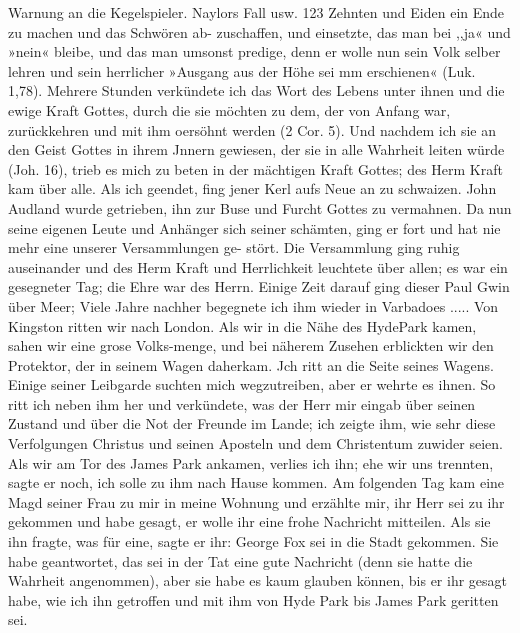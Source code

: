 Warnung an die Kegelspieler. Naylors Fall usw. 123
Zehnten und Eiden ein Ende zu machen und das Schwören ab-
zuschaffen, und einsetzte, das man bei ,,ja« und »nein« bleibe,
und das man umsonst predige, denn er wolle nun sein Volk
selber lehren und sein herrlicher »Ausgang aus der Höhe sei mm
erschienen« (Luk. 1,78). Mehrere Stunden verkündete ich das
Wort des Lebens unter ihnen und die ewige Kraft Gottes, durch
die sie möchten zu dem, der von Anfang war, zurückkehren und
mit ihm oersöhnt werden (2 Cor. 5). Und nachdem ich sie an den
Geist Gottes in ihrem Jnnern gewiesen, der sie in alle Wahrheit
leiten würde (Joh. 16), trieb es mich zu beten in der mächtigen
Kraft Gottes; des Herm Kraft kam über alle. Als ich geendet,
fing jener Kerl aufs Neue an zu schwaizen. John Audland
wurde getrieben, ihn zur Buse und Furcht Gottes zu vermahnen.
Da nun seine eigenen Leute und Anhänger sich seiner schämten,
ging er fort und hat nie mehr eine unserer Versammlungen ge-
stört. Die Versammlung ging ruhig auseinander und des Herm
Kraft und Herrlichkeit leuchtete über allen; es war ein gesegneter
Tag; die Ehre war des Herrn. Einige Zeit darauf ging dieser
Paul Gwin über Meer; Viele Jahre nachher begegnete ich ihm
wieder in Varbadoes .....
Von Kingston ritten wir nach London. Als wir in die Nähe
des HydePark kamen, sahen wir eine grose Volks-menge, und bei
näherem Zusehen erblickten wir den Protektor, der in seinem
Wagen daherkam. Jch ritt an die Seite seines Wagens. Einige
seiner Leibgarde suchten mich wegzutreiben, aber er wehrte es
ihnen. So ritt ich neben ihm her und verkündete, was der Herr
mir eingab über seinen Zustand und über die Not der Freunde
im Lande; ich zeigte ihm, wie sehr diese Verfolgungen Christus
und seinen Aposteln und dem Christentum zuwider seien. Als wir
am Tor des James Park ankamen, verlies ich ihn; ehe wir uns
trennten, sagte er noch, ich solle zu ihm nach Hause kommen.
Am folgenden Tag kam eine Magd seiner Frau zu mir in meine
Wohnung und erzählte mir, ihr Herr sei zu ihr gekommen und
habe gesagt, er wolle ihr eine frohe Nachricht mitteilen. Als sie
ihn fragte, was für eine, sagte er ihr: George Fox sei in die
Stadt gekommen. Sie habe geantwortet, das sei in der Tat eine
gute Nachricht (denn sie hatte die Wahrheit angenommen), aber sie
habe es kaum glauben können, bis er ihr gesagt habe, wie ich ihn
getroffen und mit ihm von Hyde Park bis James Park geritten sei.


